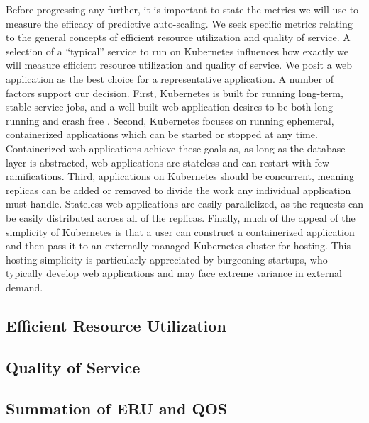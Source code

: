 Before progressing any further, it is important to state the metrics we will use
to measure the efficacy of predictive auto-scaling. We seek specific metrics relating to
the general concepts of efficient resource utilization and quality of service.
A selection of a ``typical'' service to run on Kubernetes influences how exactly
we will measure efficient resource utilization and quality of service. We posit
a web application as the best choice for a representative application. A number
of factors support our decision. First, Kubernetes is built for running
long-term, stable service jobs, and a well-built web application desires to be
both long-running and crash free \cite{k8s-design-overview}. Second, Kubernetes
focuses on running ephemeral, containerized applications which can be started or
stopped at any time. Containerized web applications achieve these goals as, as
long as the database layer is abstracted, web applications are stateless and can
restart with few ramifications. Third, applications on Kubernetes should be
concurrent, meaning replicas can be added or removed to divide the work any
individual application must handle. Stateless web applications are easily
parallelized, as the requests can be easily distributed across all of the
replicas. Finally, much of the appeal of the simplicity of Kubernetes is that a
user can construct a containerized application and then pass it to an
externally managed Kubernetes cluster for hosting. This hosting simplicity is
particularly appreciated by burgeoning startups, who typically develop web
applications and may face extreme variance in external demand.

\subsection{Efficient Resource Utilization}



\subsection{Quality of Service}



\subsection{Summation of ERU and QOS}


